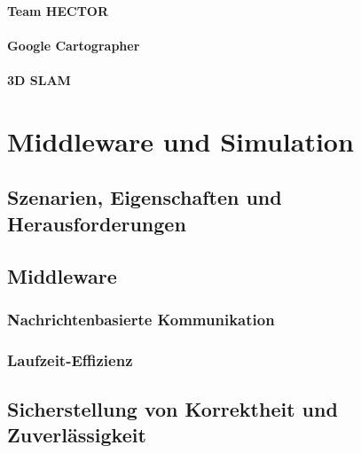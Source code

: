 \documentclass[a4paper, 11pt, accentcolor = tud3b]{tudreport}
\begin{document}
				\subsubsection{Team HECTOR} %

				\subsubsection{Google Cartographer} %

				\subsubsection{3D SLAM} %

	\chapter{Middleware und Simulation} %

		\section{Szenarien, Eigenschaften und Herausforderungen} %

		\section{Middleware} %

			\subsection{Nachrichtenbasierte Kommunikation} %

			\subsection{Laufzeit-Effizienz} %

		\section{Sicherstellung von Korrektheit und Zuverlässigkeit} %
\end{document}
